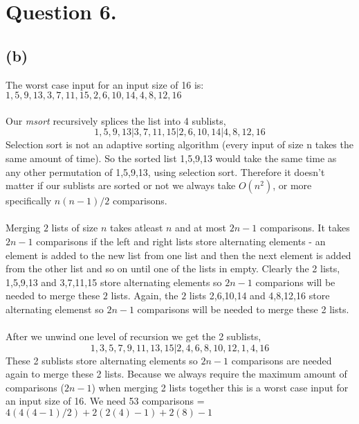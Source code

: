 \documentclass[]{article}
\begin{document}
\section*{Question 6.}
\subsection*{(b)}
The worst case input for an input size of 16 is: $1, 5, 9, 13, 3, 7, 11, 15, 2, 6, 10, 14, 4, 8, 12, 16$
\\
\\
Our \textit{msort} recursively splices the list into 4 sublists,
$$1, 5, 9, 13 | 3, 7, 11, 15 | 2, 6, 10, 14 | 4, 8, 12, 16$$
Selection sort is not an adaptive sorting algorithm (every input of size n takes the same amount of time).
So the sorted list 1,5,9,13 would take the same time as any other permutation of 1,5,9,13, using selection sort. Therefore it doesn't matter if our sublists are sorted or not we always take $O(n^2)$, or more specifically $n(n-1)/2$ comparisons.
\\
\\
Merging $2$ lists of size $n$ takes atleast $n$ and at most $2n-1$ comparisons. It takes $2n-1$ comparisons if the left and right lists store alternating elements - an element is added to the new list from one list and then the next element is added from the other list and so on until one of the lists in empty. Clearly the 2 lists, 1,5,9,13 and 3,7,11,15 store alternating elements so $2n-1$ comparions will be needed to merge these $2$ lists. Again, the $2$ lists 2,6,10,14 and 4,8,12,16 store alternating elemenst so $2n-1$ comparisons will be needed to merge these 2 lists.
\\
\\
After we unwind one level of recursion we get the 2 sublists,
$$1, 3, 5, 7, 9, 11, 13, 15 | 2, 4, 6, 8, 10, 12, 1, 4, 16$$
These 2 sublists store alternating elements so $2n-1$ comparisons are needed again to merge these 2 lists. Because we always require the maximum amount of comparisons ($2n-1$) when merging 2 lists together this is a worst case input for an input size of 16. We need 53 comparisons = $4(4(4-1)/2) + 2(2(4)-1) + 2(8)-1$
\end{document}
